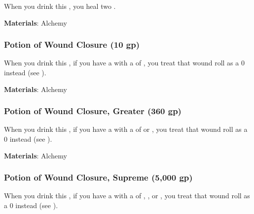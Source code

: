When you drink this , you heal two .



\vspace{0.25em}
\textbf{Materials}: Alchemy


\lowercase{\hypertarget{item:Potion of Wound Closure}{}}\label{item:Potion of Wound Closure}
\hypertarget{item:Potion of Wound Closure}{\subsubsection{Potion of Wound Closure\hfill{} (10 gp)}}

When you drink this , if you have a  with a  of , you treat that wound roll as a 0 instead (see ).



\vspace{0.25em}
\textbf{Materials}: Alchemy


\lowercase{\hypertarget{item:Potion of Wound Closure, Greater}{}}\label{item:Potion of Wound Closure, Greater}
\hypertarget{item:Potion of Wound Closure, Greater}{\subsubsection{Potion of Wound Closure, Greater\hfill{} (360 gp)}}

When you drink this , if you have a  with a  of  or , you treat that wound roll as a 0 instead (see ).



\vspace{0.25em}
\textbf{Materials}: Alchemy


\lowercase{\hypertarget{item:Potion of Wound Closure, Supreme}{}}\label{item:Potion of Wound Closure, Supreme}
\hypertarget{item:Potion of Wound Closure, Supreme}{\subsubsection{Potion of Wound Closure, Supreme\hfill{} (5,000 gp)}}

When you drink this , if you have a  with a  of , , or , you treat that wound roll as a 0 instead (see ).




